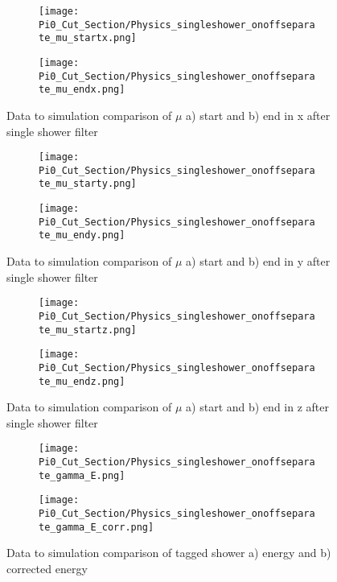 \begin{figure}[H]
  \begin{subfigure}[t]{0.3\textwidth}
\texttt{[image: Pi0\_Cut\_Section/Physics\_singleshower\_onoffseparate\_mu\_startx.png]}
  \caption{ }
  \end{subfigure} 
  \hspace{32mm}
  \begin{subfigure}[t]{0.3\textwidth}
\texttt{[image: Pi0\_Cut\_Section/Physics\_singleshower\_onoffseparate\_mu\_endx.png]}
  \caption{ }
  \end{subfigure} 
\caption{ Data to simulation comparison of $\mu$ a) start and b) end in x after single shower filter }
\label{fig:physics_singleshower_x}
\end{figure}

\begin{figure}[H]
  \begin{subfigure}[t]{0.3\textwidth}
\texttt{[image: Pi0\_Cut\_Section/Physics\_singleshower\_onoffseparate\_mu\_starty.png]}
  \caption{ }
  \end{subfigure} 
  \hspace{32mm}
  \begin{subfigure}[t]{0.3\textwidth}
\texttt{[image: Pi0\_Cut\_Section/Physics\_singleshower\_onoffseparate\_mu\_endy.png]}
  \caption{ }
  \end{subfigure} 
\caption{ Data to simulation comparison of $\mu$ a) start and b) end in y after single shower filter }
\label{fig:physics_singleshower_y}
\end{figure}

\begin{figure}[H]
  \begin{subfigure}[t]{0.3\textwidth}
\texttt{[image: Pi0\_Cut\_Section/Physics\_singleshower\_onoffseparate\_mu\_startz.png]}
  \caption{ }
  \end{subfigure} 
  \hspace{32mm}
  \begin{subfigure}[t]{0.3\textwidth}
\texttt{[image: Pi0\_Cut\_Section/Physics\_singleshower\_onoffseparate\_mu\_endz.png]}
  \caption{ }
  \end{subfigure} 
\caption{ Data to simulation comparison of $\mu$ a) start and b) end in z after single shower filter }
\label{fig:physics_singleshower_z}
\end{figure}

\begin{figure}[H]
  \begin{subfigure}[t]{0.3\textwidth}
\texttt{[image: Pi0\_Cut\_Section/Physics\_singleshower\_onoffseparate\_gamma\_E.png]}
  \caption{ }
  \end{subfigure} 
  \hspace{32mm}
  \begin{subfigure}[t]{0.3\textwidth}
\texttt{[image: Pi0\_Cut\_Section/Physics\_singleshower\_onoffseparate\_gamma\_E\_corr.png]}
  \caption{ }
  \end{subfigure} 
\caption{ Data to simulation comparison of tagged shower a) energy and b) corrected energy }
\label{fig:physics_singleshower_e}
\end{figure}

